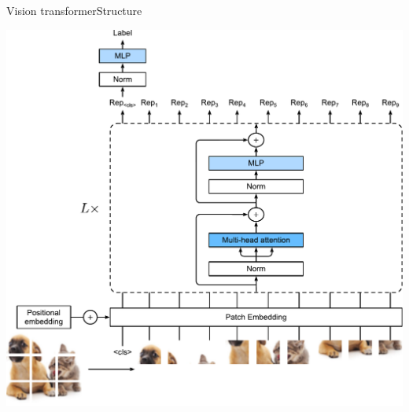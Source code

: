 \documentclass{beamer}
\begin{document}
\begin{frame}{Vision transformer}{Structure}
\vspace{-0.6cm}
\begin{center}
    \includegraphics[scale=0.43]{Module 6 (Attention-based networks)/pics/vit.pdf}
\end{center}
\end{frame}
\end{document}
